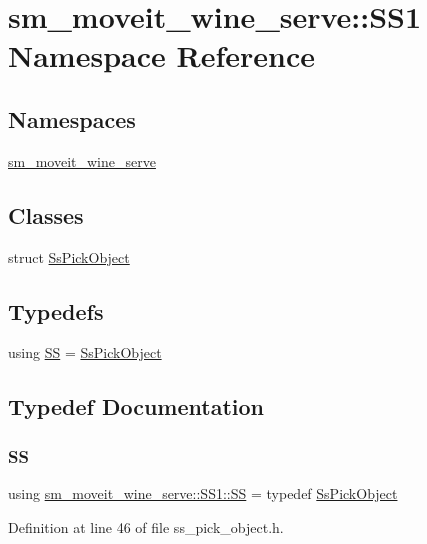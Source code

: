 \hypertarget{namespacesm__moveit__wine__serve_1_1SS1}{}\section{sm\+\_\+moveit\+\_\+wine\+\_\+serve\+:\+:S\+S1 Namespace Reference}
\label{namespacesm__moveit__wine__serve_1_1SS1}
\subsection*{Namespaces}
\begin{DoxyCompactItemize}
\item 
 \hyperlink{namespacesm__moveit__wine__serve_1_1SS1_1_1sm__moveit__wine__serve}{sm\+\_\+moveit\+\_\+wine\+\_\+serve}
\end{DoxyCompactItemize}
\subsection*{Classes}
\begin{DoxyCompactItemize}
\item 
struct \hyperlink{structsm__moveit__wine__serve_1_1SS1_1_1SsPickObject}{Ss\+Pick\+Object}
\end{DoxyCompactItemize}
\subsection*{Typedefs}
\begin{DoxyCompactItemize}
\item 
using \hyperlink{namespacesm__moveit__wine__serve_1_1SS1_a6520107acc0232a484758ab51183f505}{SS} = \hyperlink{structsm__moveit__wine__serve_1_1SS1_1_1SsPickObject}{Ss\+Pick\+Object}
\end{DoxyCompactItemize}


\subsection{Typedef Documentation}
\mbox{\label{namespacesm__moveit__wine__serve_1_1SS1_a6520107acc0232a484758ab51183f505}} 
\subsubsection{\texorpdfstring{SS}{SS}}
{\footnotesize\ttfamily using \hyperlink{namespacesm__moveit__wine__serve_1_1SS1_a6520107acc0232a484758ab51183f505}{sm\+\_\+moveit\+\_\+wine\+\_\+serve\+::\+S\+S1\+::\+SS} = typedef \hyperlink{structsm__moveit__wine__serve_1_1SS1_1_1SsPickObject}{Ss\+Pick\+Object}}



Definition at line 46 of file ss\+\_\+pick\+\_\+object.\+h.

